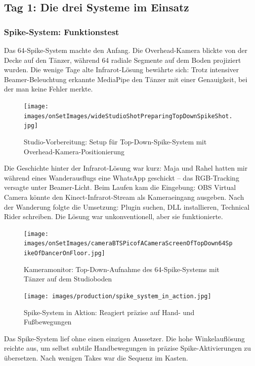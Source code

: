 \newpage

\subsection{Tag 1: Die drei Systeme im Einsatz}

\subsubsection{Spike-System: Funktionstest}

Das 64-Spike-System machte den Anfang. Die Overhead-Kamera blickte von der Decke auf den Tänzer, während 64 radiale Segmente auf dem Boden projiziert wurden. Die wenige Tage alte Infrarot-Lösung bewährte sich: Trotz intensiver Beamer-Beleuchtung erkannte MediaPipe den Tänzer mit einer Genauigkeit, bei der man keine Fehler merkte.

\begin{figure}[h]
   \centering
   \texttt{[image: images/onSetImages/wideStudioShotPreparingTopDownSpikeShot.jpg]}
   \caption{Studio-Vorbereitung: Setup für Top-Down-Spike-System mit Overhead-Kamera-Positionierung}
   \label{fig:topdown_setup}
\end{figure}

Die Geschichte hinter der Infrarot-Lösung war kurz: Maja und Rahel hatten mir während eines Wanderausflugs eine WhatsApp geschickt – das RGB-Tracking versagte unter Beamer-Licht. Beim Laufen kam die Eingebung: OBS Virtual Camera könnte den Kinect-Infrarot-Stream als Kameraeingang ausgeben. Nach der Wanderung folgte die Umsetzung: Plugin suchen, DLL installieren, Technical Rider schreiben. Die Lösung war unkonventionell, aber sie funktionierte.

\begin{figure}[h]
   \centering
   \texttt{[image: images/onSetImages/cameraBTSPicofACameraScreenOfTopDown64SpikeOfDancerOnFloor.jpg]}
   \caption{Kameramonitor: Top-Down-Aufnahme des 64-Spike-Systems mit Tänzer auf dem Studioboden}
   \label{fig:camera_monitor}
\end{figure}

\begin{figure}[h]
   \centering
   \texttt{[image: images/production/spike\_system\_in\_action.jpg]}
   \caption{Spike-System in Aktion: Reagiert präzise auf Hand- und Fußbewegungen}
   \label{fig:spike_action}
\end{figure}

Das Spike-System lief ohne einen einzigen Aussetzer. Die hohe Winkelauflösung reichte aus, um selbst subtile Handbewegungen in präzise Spike-Aktivierungen zu übersetzen. Nach wenigen Takes war die Sequenz im Kasten.

